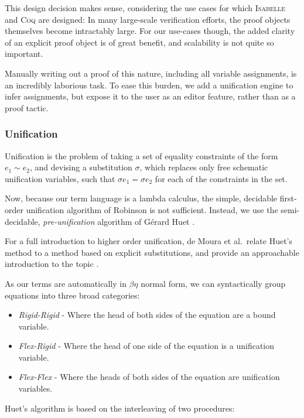 \documentclass[a4paper]{jfp}
\begin{document}
This design decision makes sense, considering the use cases for which \textsc{Isabelle} and \textsc{Coq} are designed:
In many large-scale verification efforts, the proof objects themselves become intractably large. For
our use-cases though, the added clarity of an explicit proof object is of great benefit, and scalability
is not quite so important.

Manually writing out a proof of this nature, including all variable assignments, is an incredibly laborious task. To ease this burden, we add a unification engine to infer assignments, but expose it to the user
as an editor feature, rather than as a proof tactic.

\subsubsection{Unification}

Unification is the problem of taking a set of equality constraints of the form $e_1 \sim e_2$, and 
devising a substitution $\sigma$, which replaces only free schematic unification variables, such that 
$\sigma e_1 = \sigma e_2$ for each of the constraints in the set.

Now, because our term language is a lambda calculus, the simple, decidable first-order unification
algorithm of Robinson \cite{Robinson:1965:MLB:321250.321253} is not sufficient. Instead, we use
the semi-decidable, \emph{pre-unification} algorithm of G\'erard Huet \cite{DBLP:journals/tcs/Huet75}.

For a full introduction to higher order unification, de Moura et al.\ relate Huet's method to a
method based on explicit substitutions, and provide an approachable introduction to the topic \cite{deMoura200872}.

As our terms are automatically in $\beta\eta$ normal form, we can syntactically group equations into three 
broad categories:

\begin{itemize}
        \item \emph{Rigid-Rigid} - Where the head of both sides of the equation are a bound variable.
        \item \emph{Flex-Rigid}  - Where the head of one side of the equation is a unification variable.
        \item \emph{Flex-Flex}   - Where the heads of both sides of the equation are unification variables.
\end{itemize}

Huet's algorithm is based on the interleaving of two procedures:
\end{document}
